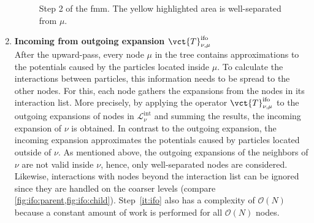 \begin{enumerate}
\begin{figure}
{
        }
      \hfill\null
      \caption{Step 2 of the \gls{fmm}. The yellow highlighted area is well-separated from $\mu$.}
      \label{fig:ofo}
    \end{figure}
    \label{it:ofo}

  \item \textbf{Incoming from outgoing expansion $\vct{T}_{\nu,\mu}^{\mathrm{ifo}}$}
    \\
    After the upward-pass, every node $\mu$ in the tree contains approximations to the potentials caused by the particles located inside $\mu$.
    To calculate the interactions between particles, this information needs to be spread to the other nodes.
    For this, each node gathers the expansions from the nodes in its interaction list.
    More precisely, by applying the operator $\vct{T}_{\nu,\mu}^{\mathrm{ifo}}$ to the outgoing expansions of nodes in $\mathcal{L}_\nu^\text{int}$ and summing the results, the incoming expansion of $\nu$ is obtained.
    In contrast to the outgoing expansion, the incoming expansion approximates the potentials caused by particles located outside of $\nu$.
    As mentioned above, the outgoing expansions of the neighbors of $\nu$ are not valid inside $\nu$, hence, only well-separated nodes are considered.
    Likewise, interactions with nodes beyond the interaction list can be ignored since they are handled on the coarser levels (compare \cref{fig:ifo:parent,fig:ifo:child}).
    Step~\ref{it:ifo} also has a complexity of $\mathcal{O}(N)$ because a constant amount of work is performed for all $\mathcal{O}(N)$ nodes.
    \label{it:ifo}


\end{enumerate}
